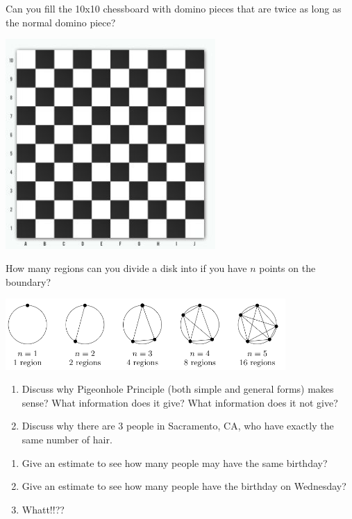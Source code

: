 \documentclass[12pt]{amsart}
\begin{document}
\begin{question}[10x10 chessboard]
	Can you fill the 10x10 chessboard with domino pieces that are twice as
	long as the normal domino piece?
	\begin{center}
		\includegraphics[width=0.6\textwidth]{Checker3.jpg}
	\end{center}
\end{question}

\begin{question}
	How many regions can you divide a disk into if you have $n$ points on the boundary?
	\begin{center}
		\includegraphics[width=0.8\textwidth]{Regions.png}
	\end{center}
\end{question}

\begin{question}
	\begin{enumerate}
		\item Discuss why Pigeonhole Principle (both simple and general forms) makes sense?
		      What information does it give? What information does it not give?
		\item Discuss why there are 3 people in Sacramento, CA, who have exactly the same number of hair.
	\end{enumerate}
\end{question}

\begin{question}
	\begin{enumerate}
		\item Give an estimate to see how many people may have the same birthday?
		\item Give an estimate to see how many people have the birthday on Wednesday?
		\item Whatt!!??
	\end{enumerate}
\end{question}
\end{document}
